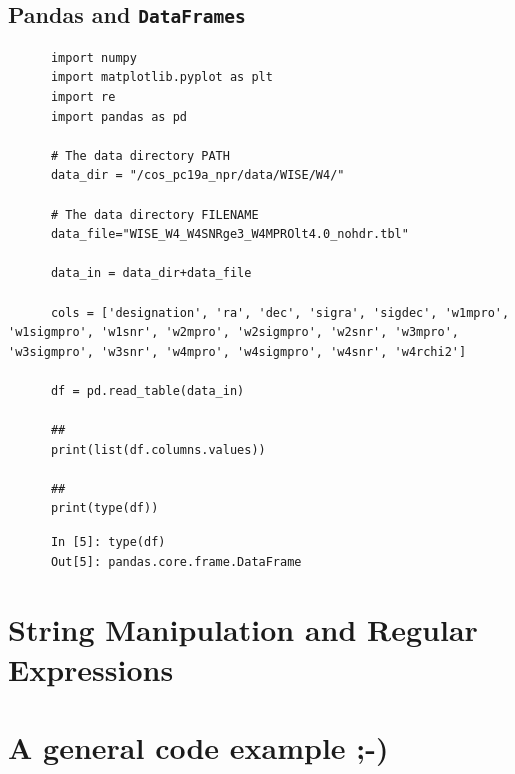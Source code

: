 \documentclass[11pt,a4paper]{article}
\begin{document}
    \subsection{Pandas and {\tt DataFrames}}
    \begin{lstlisting}
      import numpy
      import matplotlib.pyplot as plt
      import re
      import pandas as pd 
      
      # The data directory PATH
      data_dir = "/cos_pc19a_npr/data/WISE/W4/"
      
      # The data directory FILENAME
      data_file="WISE_W4_W4SNRge3_W4MPROlt4.0_nohdr.tbl"
      
      data_in = data_dir+data_file
      
      cols = ['designation', 'ra', 'dec', 'sigra', 'sigdec', 'w1mpro', 'w1sigmpro', 'w1snr', 'w2mpro', 'w2sigmpro', 'w2snr', 'w3mpro', 'w3sigmpro', 'w3snr', 'w4mpro', 'w4sigmpro', 'w4snr', 'w4rchi2']
      
      df = pd.read_table(data_in) 
      
      ##
      print(list(df.columns.values))
      
      ## 
      print(type(df))
    \end{lstlisting}
    
    \begin{lstlisting}
      In [5]: type(df)
      Out[5]: pandas.core.frame.DataFrame
    \end{lstlisting}

    


\newpage
\section{String Manipulation and Regular Expressions}






\newpage
\section{A general code example ;-)} 
\end{document}
